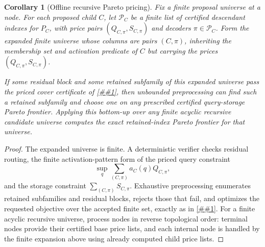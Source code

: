 \documentclass[10pt]{article}
\newcommand{\cref}[1]{\ref{##1}}
\newtheorem{corollary}[theorem]{Corollary}
\theoremstyle{definition}
\begin{document}
\begin{corollary}[Offline recursive Pareto pricing]
   \label{cor:offline-recursive-pareto-pricing}
   Fix a finite proposal universe at a node.  For each proposed child $C$, let
   $\mathcal P_C$ be a finite list of certified descendant indexes for $P_C$,
   with price pairs $(Q_{C,\pi},S_{C,\pi})$ and decoders
   $\pi\in\mathcal P_C$.  Form the expanded finite universe whose columns are
   pairs $(C,\pi)$, inheriting the membership set and activation predicate of
   $C$ but carrying the prices $(Q_{C,\pi},S_{C,\pi})$.

   If some residual block and some retained subfamily of this expanded universe
   pass the priced cover certificate of \cref{lem:priced-cover-compiler}, then
   unbounded preprocessing can find such a retained subfamily and choose one on
   any prescribed certified query-storage Pareto frontier.  Applying this
   bottom-up over any finite acyclic recursive candidate universe computes the
   exact retained-index Pareto frontier for that universe.
\end{corollary}

\begin{proof}
   The expanded universe is finite.  A deterministic verifier checks residual
   routing, the finite activation-pattern form of the priced query constraint
   \[
      \sup_q\sum_{(C,\pi)}a_C(q)Q_{C,\pi},
   \]
   and the storage constraint $\sum_{(C,\pi)}S_{C,\pi}$.  Exhaustive
   preprocessing enumerates retained subfamilies and residual blocks, rejects
   those that fail, and optimizes the requested objective over the accepted
   finite set, exactly as in \cref{cor:offline-pareto-compression}.  For a
   finite acyclic recursive universe, process nodes in reverse topological
   order: terminal nodes provide their certified base price lists, and each
   internal node is handled by the finite expansion above using already
   computed child price lists.
\end{proof}
\end{document}

